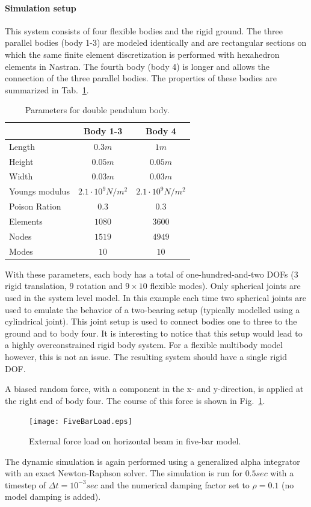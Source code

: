 \paragraph{Simulation setup}
This system consists of four flexible bodies and the rigid ground. The three parallel bodies (body 1-3) are modeled identically and are rectangular sections on which the same finite element discretization is performed with hexahedron elements in Nastran. The fourth body (body 4) is longer and allows the connection of the three parallel bodies. The properties of these bodies are summarized in Tab.~\ref{tab:FiveBarProperties}. 
\begin{table}[htp]
\centering
\caption{Parameters for double pendulum body.} \label{tab:FiveBarProperties}
\vspace{1ex}
\begin{tabular}{l c c}
\toprule
 & Body 1-3 & Body 4 \\ 
\bottomrule
Length 	& $0.3m$	& $1m$\\[0.2ex]
Height & $0.05m$	& $0.05m$\\[0.2ex]
Width & $0.03m$	& $0.03m$\\[0.2ex]
Youngs modulus & $2.1\cdot 10^9 N/m^2$	& $2.1\cdot 10^9 N/m^2$\\[0.2ex]
Poison Ration & $0.3$	& $0.3$\\[0.2ex]
Elements & $1080$	& $3600$ \\[0.2ex] 
Nodes & $1519$	& $4949$\\[0.2ex]
Modes & $10$	& $10$ \\[0.2ex] 
\bottomrule
\end{tabular}
\end{table}
With these parameters, each body has a total of one-hundred-and-two DOFs ($3$ rigid translation, $9$ rotation and $9\times 10$ flexible modes).
Only spherical joints are used in the system level model. In this example each time two spherical joints are used to emulate the behavior of a two-bearing setup (typically modelled using a cylindrical joint). This joint setup is used to connect bodies one to three to the ground and to body four. It is interesting to notice that this setup would lead to a highly overconstrained rigid body system. For a flexible multibody model however, this is not an issue. The resulting system should have a single rigid DOF. 
 
A biased random force, with a component in the x- and y-direction, is applied at the right end of body four. The course of this force is shown in Fig.~\ref{fig:FiveBarLoad}.
\begin{figure}[htp]
\centering
\texttt{[image: FiveBarLoad.eps]} 
\caption{External force load on horizontal beam in five-bar model.}
\label{fig:FiveBarLoad}
\end{figure}
The dynamic simulation is again performed using a generalized alpha integrator with an exact Newton-Raphson solver\cite{BrulsGenAlpha}. The simulation is run for $0.5sec$ with a timestep of $\Delta t = 10^{-3}sec$ and the numerical damping factor set to $\rho = 0.1$ (no model damping is added). 


